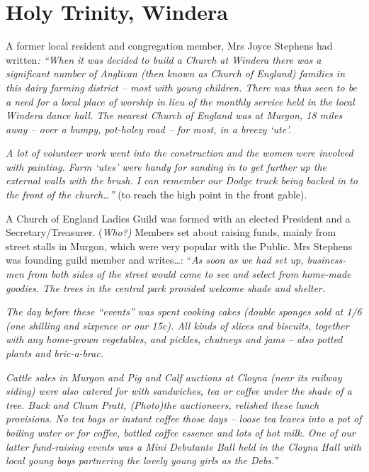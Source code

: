 \hypertarget{holy-trinity-windera}{%
\section{Holy Trinity, Windera}\label{holy-trinity-windera}}

A former local resident and congregation member, Mrs Joyce Stephens had
written\emph{: ``When it was decided to build a Church at Windera there
was a significant number of Anglican (then known as Church of England)
families in this dairy farming district -- most with young children.
There was thus seen to be a need for a local place of worship in lieu of
the monthly service held in the local Windera dance hall. The nearest
Church of England was at Murgon, 18 miles away -- over a bumpy,
pot-holey road -- for most, in a breezy `ute'.}

\emph{A lot of volunteer work went into the construction and the women
were involved with painting. Farm `utes' were handy for sanding in to
get further up the external walls with the brush. I can remember our
Dodge truck being backed in to the front of the church\ldots''} (to
reach the high point in the front gable).

A Church of England Ladies Guild was formed with an elected President
and a Secretary/Treasurer. (\emph{Who?)} Members set about raising
funds, mainly from street stalls in Murgon, which were very popular with
the Public. Mrs Stephens was founding guild member and writes\ldots:
``\emph{As soon as we had set up, business-men from both sides of the
street would come to see and select from home-made goodies. The trees in
the central park provided welcome shade and shelter.}

\emph{The day before these ``events'' was spent cooking cakes (double
sponges sold at 1/6 (one shilling and sixpence or our 15c). All kinds of
slices and biscuits, together with any home-grown vegetables, and
pickles, chutneys and jams -- also potted plants and bric-a-brac.}

\emph{Cattle sales in Murgon and Pig and Calf auctions at Cloyna (near
its railway siding) were also catered for with sandwiches, tea or coffee
under the shade of a tree. Buck and Chum Pratt, (Photo)the auctioneers,
relished these lunch provisions. No tea bags or instant coffee those
days -- loose tea leaves into a pot of boiling water or for coffee,
bottled coffee essence and lots of hot milk. One of our latter
fund-raising events was a Mini Debutante Ball held in the Cloyna Hall
with local young boys partnering the lovely young girls as the Debs.''}

